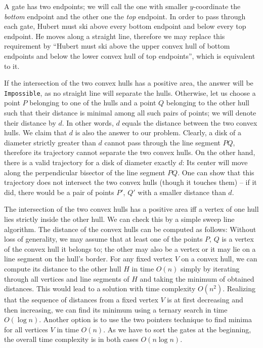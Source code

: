 

A gate has two endpoints; we will call the one with smaller $y$-coordinate the
\emph{bottom} endpoint and the other one the \emph{top} endpoint. In order to
pass through each gate, Hubert must ski above every bottom endpoint and below
every top endpoint. He moves along a straight line, therefore we may replace
this requirement by ``Hubert must ski above the upper convex hull of bottom
endpoints and below the lower convex hull of top endpoints'', which is
equivalent to it.

If the intersection of the two convex hulls has a positive area, the answer will
be \texttt{Impossible}, as no straight line will separate the hulls. Otherwise,
let us choose a point $P$ belonging to one of the hulls and a point $Q$
belonging to the other hull such that their distance is minimal among all such
pairs of points; we will denote their distance by $d$. In other words, $d$
equals the distance between the two convex hulls. We claim that $d$ is also the
answer to our problem. Clearly, a disk of a diameter strictly greater than $d$
cannot pass through the line segment $PQ$, therefore its trajectory cannot
separate the two convex hulls. On the other hand, there is a valid trajectory
for a disk of diameter exactly $d$: Its center will move along the perpendicular
bisector of the line segment $PQ$. One can show that this trajectory does not
intersect the two convex hulls (though it touches them) -- if it did, there
would be a pair of points $P'$, $Q'$ with a smaller distance than $d$.

The intersection of the two convex hulls has a positive area iff a vertex of one
hull lies strictly inside the other hull. We can check this by a simple sweep
line algorithm. The distance of the convex hulls can be computed as follows:
Without loss of generality, we may assume that at least one of the points $P$,
$Q$ is a vertex of the convex hull it belongs to; the other may also be a vertex
or it may lie on a line segment on the hull's border. For any fixed vertex $V$
on a convex hull, we can compute its distance to the other hull $H$ in time
$O(n)$ simply by iterating through all vertices and line segments of $H$ and
taking the minimum of obtained distances. This would lead to a solution with
time complexity $O(n^2)$. Realizing that the sequence of distances from a fixed
vertex $V$ is at first decreasing and then increasing, we can find its minimum
using a ternary search in time $O(\log n)$. Another option is to use the two
pointers technique to find minima for all vertices $V$ in time $O(n)$. As we
have to sort the gates at the beginning, the overall time complexity is in both
cases $O(n\log n)$.
